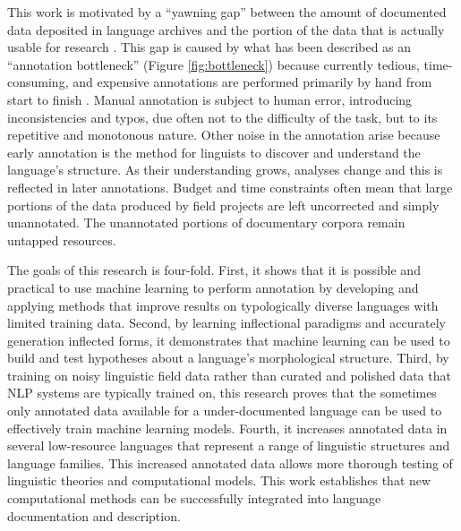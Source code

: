 This work is motivated by a “yawning gap” between the amount of documented data deposited in language archives and the portion of the data that is actually usable for research \citep{seifart_language_2018}. This gap is caused by what has been described as an ``annotation bottleneck'' (Figure \ref{fig:bottleneck}) because currently tedious, time-consuming, and expensive annotations are performed primarily by hand from start to finish \citep{simons_worlds_2013,holton_developing_2017}. Manual annotation is subject to human error, introducing inconsistencies and typos, due often not to the difficulty of the task, but to its repetitive and monotonous nature. Other noise in the annotation arise because early annotation is the method for linguists to discover and understand the language's structure. As their understanding grows, analyses change and this is reflected in later annotations.
Budget and time constraints often mean that large portions of the data produced by field projects are left uncorrected and simply unannotated. The unannotated portions of documentary corpora remain untapped resources. 


The goals of this research is four-fold. First, it shows that it is possible and practical to use machine learning to perform annotation by developing and applying methods that improve results on typologically diverse languages with limited training data. Second, by learning inflectional paradigms and accurately generation inflected forms, it demonstrates that machine learning can be used to build and test hypotheses about a language's morphological structure. Third, by training on noisy linguistic field data rather than curated and polished data that NLP systems are typically trained on, this research proves that the sometimes only annotated data available for a under-documented language can be used to effectively train machine learning models. 
Fourth,  it increases annotated data in several low-resource languages that represent a range of linguistic structures and language families. This increased annotated data allows more thorough testing of linguistic theories and computational models.
This work establishes that new computational methods can be successfully integrated into language documentation and description. 

